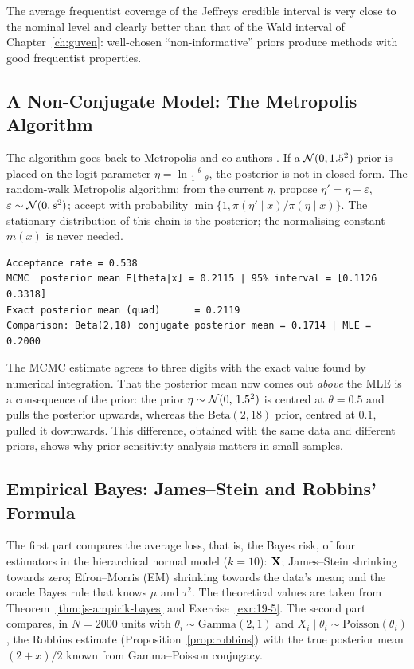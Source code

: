 \documentclass[main.tex]{subfiles}
\begin{document}
The average frequentist coverage of the Jeffreys credible interval is very close to the nominal level and clearly better than that of the Wald interval of Chapter~\ref{ch:guven}: well-chosen ``non-informative'' priors produce methods with good frequentist properties.

\subsection{A Non-Conjugate Model: The Metropolis Algorithm}
The algorithm goes back to Metropolis and co-authors \cite{metropolis53}. If a $\mathcal{N}(0,1.5^2)$ prior is placed on the logit parameter $\eta=\ln\frac{\theta}{1-\theta}$, the posterior is not in closed form. The random-walk Metropolis algorithm: from the current $\eta$, propose $\eta'=\eta+\varepsilon$, $\varepsilon\sim\mathcal{N}(0,s^2)$; accept with probability $\min\{1,\pi(\eta'\mid x)/\pi(\eta\mid x)\}$. The stationary distribution of this chain is the posterior; the normalising constant $m(x)$ is never needed.

\begin{lstlisting}[style=output]
Acceptance rate = 0.538
MCMC  posterior mean E[theta|x] = 0.2115 | 95% interval = [0.1126 0.3318]
Exact posterior mean (quad)      = 0.2119
Comparison: Beta(2,18) conjugate posterior mean = 0.1714 | MLE = 0.2000
\end{lstlisting}

The MCMC estimate agrees to three digits with the exact value found by numerical integration. That the posterior mean now comes out \emph{above} the MLE is a consequence of the prior: the prior $\eta\sim\mathcal{N}(0,\,1.5^2)$ is centred at $\theta=0.5$ and pulls the posterior upwards, whereas the $\text{Beta}(2,18)$ prior, centred at $0.1$, pulled it downwards. This difference, obtained with the same data and different priors, shows why prior sensitivity analysis matters in small samples.

\subsection{Empirical Bayes: James--Stein and Robbins' Formula}
The first part compares the average loss, that is, the Bayes risk, of four estimators in the hierarchical normal model ($k=10$): $\mathbf{X}$; James--Stein shrinking towards zero; Efron--Morris (EM) shrinking towards the data's mean; and the oracle Bayes rule that knows $\mu$ and $\tau^2$. The theoretical values are taken from Theorem~\ref{thm:js-ampirik-bayes} and Exercise~\ref{exr:19-5}. The second part compares, in $N=2000$ units with $\theta_i\sim\text{Gamma}(2,1)$ and $X_i\mid\theta_i\sim\text{Poisson}(\theta_i)$, the Robbins estimate (Proposition~\ref{prop:robbins}) with the true posterior mean $(2+x)/2$ known from Gamma--Poisson conjugacy.
\end{document}
